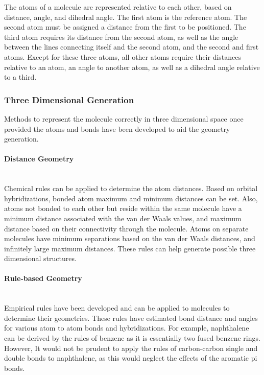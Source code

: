 \documentclass[12pt]{article}
\begin{document}
The atoms of a molecule are represented relative to each other, based on distance, angle, and dihedral angle. The first atom is the reference atom. The second atom must be assigned a distance from the first to be positioned. The third atom requires its distance from the second atom, as well as the angle between the lines connecting itself and the second atom, and the second and first atoms. Except for these three atoms, all other atoms require their distances relative to an atom, an angle to another atom, as well as a dihedral angle relative to a third.

\subsubsection{Three Dimensional Generation}

Methods to represent the molecule correctly in three dimensional space once provided the atoms and bonds have been developed to aid the geometry generation. 

\paragraph{Distance Geometry}\mbox{}\\

Chemical rules can be applied to determine the atom distances. Based on orbital hybridizations, bonded atom maximum and minimum distances can be set. Also, atoms not bonded to each other but reside within the same molecule have a minimum distance associated with the van der Waals values, and maximum distance based on their connectivity through the molecule. Atoms on separate molecules have minimum separations based on the van der Waals distances, and infinitely large maximum distances. These rules can help generate possible three dimensional structures.

\paragraph{Rule-based Geometry}\mbox{}\\

Empirical rules have been developed and can be applied to molecules to determine their geometries. These rules have estimated bond distance and angles for various atom to atom bonds and hybridizations. For example, naphthalene can be derived by the rules of benzene as it is essentially two fused benzene rings. However, It would not be prudent to apply the rules of carbon-carbon single and double bonds to naphthalene, as this would neglect the effects of the aromatic pi bonds.
\end{document}
